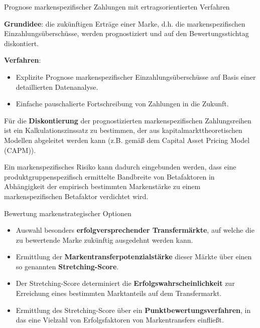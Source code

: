\documentclass[12pt,ngerman,a4paper,ignorenonframetext,]{beamer}
\providecommand{\tightlist}{%
  \setlength{\itemsep}{0pt}\setlength{\parskip}{0pt}}
\begin{document}
\begin{frame}{Prognose markenspezifischer Zahlungen mit
ertragsorientierten Verfahren}
\protect\hypertarget{prognose-markenspezifischer-zahlungen-mit-ertragsorientierten-verfahren}{}

\textbf{Grundidee}: die zukünftigen Erträge einer Marke,
d.\thinspace{}h. die markenspezifischen Einzahlungsüberschüsse, werden
prognostiziert und auf den Bewertungsstichtag diskontiert.

\textbf{Verfahren}:

\begin{itemize}
\tightlist
\item
  Explizite Prognose markenspezifischer Einzahlungsüberschüsse auf Basis
  einer detaillierten Datenanalyse.
\item
  Einfache pauschalierte Fortschreibung von Zahlungen in die Zukunft.
\end{itemize}

Für die \textbf{Diskontierung} der prognostizierten markenspezifischen
Zahlungsreihen ist ein Kalkulationszinssatz zu bestimmen, der aus
kapitalmarkttheoretischen Modellen abgeleitet werden kann
\mbox{(z.\thinspace{}B.}\xspace{} gemäß dem Capital Asset Pricing Model
(CAPM)).

Ein markenspezifisches Risiko kann dadurch eingebunden werden, dass eine
produktgruppenspezifisch ermittelte Bandbreite von Betafaktoren in
Abhängigkeit der empirisch bestimmten Markenstärke zu einem
markenspezifischen Betafaktor verdichtet wird.

\end{frame}

\begin{frame}{Bewertung markenstrategischer Optionen}
\protect\hypertarget{bewertung-markenstrategischer-optionen}{}

\begin{itemize}
\tightlist
\item
  Auswahl besonders \textbf{erfolgversprechender Transfermärkte}, auf
  welche die zu bewertende Marke zukünftig ausgedehnt werden kann.
\item
  Ermittlung der \textbf{Markentransferpotenzialstärke} dieser Märkte
  über einen so genannten \textbf{Stretching-Score}.
\item
  Der Stretching-Score determiniert die
  \textbf{Erfolgswahrscheinlichkeit} zur Erreichung eines bestimmten
  Marktanteils auf dem Transfermarkt.
\item
  Ermittlung des Stretching-Score über ein
  \textbf{Punktbewertungsverfahren}, in das eine Vielzahl von
  Erfolgsfaktoren von Markentransfers einfließt.
\end{itemize}

\end{frame}
\end{document}
